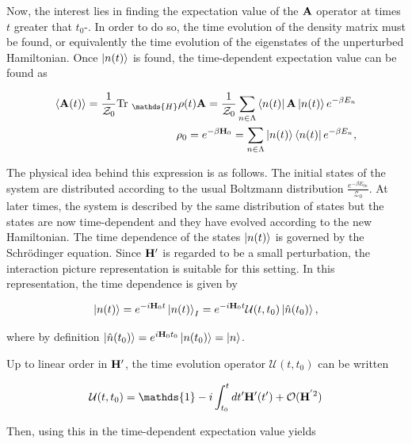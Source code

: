\documentclass{homework}
\begin{document}
Now, the interest lies in finding the expectation value of the ${\bf A}$ operator at times $t$ greater that $t_0$-. In order to do so, the time evolution of the density matrix must be found, or equivalently the time evolution of the eigenstates of the unperturbed Hamiltonian. Once $\ket{n(t)}$ is found, the time-dependent expectation value can be found as 

\begin{align}
        \langle {\bf A}(t) \rangle = \frac{1}{\mathcal{Z}_0} \textnormal{Tr }_{\mathds{H}} \rho(t) {\bf A}  = \frac{1}{\mathcal{Z}_0} \sum_{n \in \Lambda} \bra{n(t)} {{\bf A}} \ket{n(t)} e^{-\beta E_n} \\
        \rho_0 = e^{-\beta {\bf H}_0} = \sum_{n \in \Lambda} \ket{n(t)} \bra{n(t)} e^{-\beta E_n},
\end{align}

The physical idea behind this expression is as follows. The initial states of the system are distributed according to the usual Boltzmann distribution $\frac{e^{-\beta E_{0n}}}{\mathcal{Z_0}}$. At later times, the system is described by the same distribution of states but the states are now time-dependent and they have evolved according to the new Hamiltonian. The time dependence of the states $\ket{n(t)}$ is governed by the Schr\"odinger equation. Since ${\bf H}'$ is regarded to be a small perturbation, the interaction picture representation is suitable for this setting. In this representation, the time dependence is given by 

\begin{equation}
    \ket{n(t)} = e^{-i{\bf H}_0 t} \ket{n(t)}_I = e^{-i{\bf H}_0 t} \mathcal{U}(t, t_0) \ket{\hat{n}(t_0)},
\end{equation}

where by definition $\ket{\hat{n}(t_0)} = e^{i {\bf H}_0 t_0} \ket{n(t_0)} = \ket{n}$.

Up to linear order in ${\bf H}'$, the time evolution operator $\mathcal{U}(t, t_0)$ can be written 

$$
    \mathcal{U}(t, t_0) = \mathds{1} - i \int_{t_0}^t dt' \Hamiltonian'(t') + \mathcal{O}(\Hamiltonian^{'2})
$$

Then, using this in the time-dependent expectation value yields 
\end{document}
